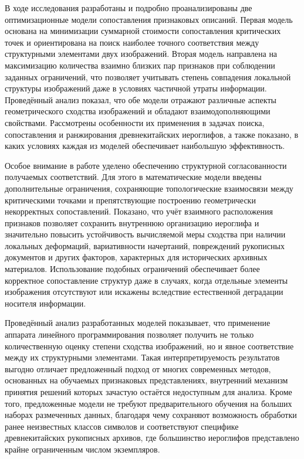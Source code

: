 В ходе исследования разработаны и подробно проанализированы две оптимизационные модели сопоставления признаковых описаний. Первая модель основана на минимизации суммарной стоимости сопоставления критических точек и ориентирована на поиск наиболее точного соответствия между структурными элементами двух изображений. Вторая модель направлена на максимизацию количества взаимно близких пар признаков при соблюдении заданных ограничений, что позволяет учитывать степень совпадения локальной структуры изображений даже в условиях частичной утраты информации. Проведённый анализ показал, что обе модели отражают различные аспекты геометрического сходства изображений и обладают взаимодополняющими свойствами. Рассмотрены особенности их применения в задачах поиска, сопоставления и ранжирования древнекитайских иероглифов, а также показано, в каких условиях каждая из моделей обеспечивает наибольшую эффективность.

Особое внимание в работе уделено обеспечению структурной согласованности получаемых соответствий. Для этого в математические модели введены дополнительные ограничения, сохраняющие топологические взаимосвязи между критическими точками и препятствующие построению геометрически некорректных сопоставлений. Показано, что учёт взаимного расположения признаков позволяет сохранить внутреннюю организацию иероглифа и значительно повысить устойчивость вычисляемой меры сходства при наличии локальных деформаций, вариативности начертаний, повреждений рукописных документов и других факторов, характерных для исторических архивных материалов. Использование подобных ограничений обеспечивает более корректное сопоставление структур даже в случаях, когда отдельные элементы изображения отсутствуют или искажены вследствие естественной деградации носителя информации.

Проведённый анализ разработанных моделей показывает, что применение аппарата линейного программирования позволяет получить не только количественную оценку степени сходства изображений, но и явное соответствие между их структурными элементами. Такая интерпретируемость результатов выгодно отличает предложенный подход от многих современных методов, основанных на обучаемых признаковых представлениях, внутренний механизм принятия решений которых зачастую остаётся недоступным для анализа. Кроме того, предложенные модели не требуют предварительного обучения на больших наборах размеченных данных, благодаря чему сохраняют возможность обработки ранее неизвестных классов символов и соответствуют специфике древнекитайских рукописных архивов, где большинство иероглифов представлено крайне ограниченным числом экземпляров.

